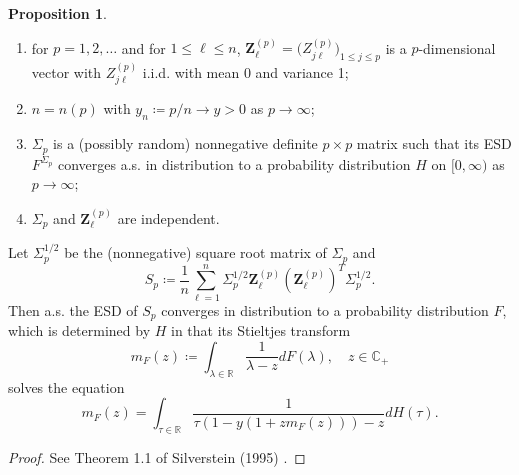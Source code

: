 \documentclass[a4paper,11pt]{book}
\theoremstyle{plain}
\theoremstyle{definition}
\newtheorem{prps}[thm]{Proposition}
\newcommand{\MR}{\mathbb{R}}
\begin{document}
	\begin{prps}\label{MP law} \
		\begin{enumerate}
			\item for $p = 1, 2, \dots$ and for $1 \leq \ell \leq n$, $\mathbf{Z}_{\ell}^{(p)} = \big(Z_{j\ell}^{(p)}\big)_{1 \leq j \leq p}$ is a $p$-dimensional vector with $Z_{j\ell}^{(p)}$ i.i.d. with mean 0 and variance 1;
			\item $n = n(p)$ with $y_n \coloneqq p/n \rightarrow y > 0$ as $p \rightarrow \infty$;
			\item $\Sigma_p$ is a (possibly random) nonnegative definite $p \times p$ matrix such that its ESD $F^{\Sigma_p}$ converges a.s. in distribution to a probability distribution $H$ on $[0,\infty)$ as $p \rightarrow \infty$;
			\item $\Sigma_p$ and $\mathbf{Z}_\ell^{(p)}$ are independent.
		\end{enumerate}
		Let $\Sigma_p^{1/2}$ be the (nonnegative) square root matrix of $\Sigma_p$ and 
		\[S_p\coloneqq \frac{1}{n} \sum_{\ell=1}^{n} \Sigma_p^{1/2} \mathbf{Z}_\ell^{(p)}(\mathbf{Z}_\ell^{(p)})^T \Sigma_p^{1/2}.\]
		Then a.s. the ESD of $S_p$ converges in distribution to a probability distribution $F$, which is determined by $H$ in that its Stieltjes transform
		\[ m_F(z)\coloneqq\int_{\lambda \in \MR} \frac{1}{\lambda - z} dF(\lambda) , \quad z \in \mathbb{C}_+ \]
		solves the equation
		\begin{equation} \label{MP eq}
		m_F(z) = \int_{\tau \in \MR} \frac{1}{\tau (1-y(1+zm_F(z))) - z } dH(\tau).
		\end{equation}
	\end{prps}
	\begin{proof}
		 See Theorem 1.1 of Silverstein (1995) \cite{Silverstein}.
	\end{proof}
	
\end{document}
